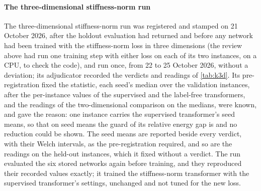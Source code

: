 \paragraph{The three-dimensional stiffness-norm run}
The three-dimensional stiffness-norm run was registered and stamped on 21 October 2026,
after the holdout evaluation had returned and before any network had been trained with the
stiffness-norm loss in three dimensions (the review above had run one training step with
either loss on each of its two instances, on a CPU, to check the code), and run once, from
22 to 25 October 2026, without a deviation; its adjudicator recorded the verdicts and
readings of \cref{tab:k3d}. Its pre-registration fixed the statistic, each seed's median
over the validation instances, after the per-instance values of the supervised and the
label-free transformers, and the readings of the two-dimensional comparison on the medians,
were known, and gave the reason: one instance carries the supervised transformer's seed
means, so that on seed means the guard of its relative energy gap is \numKdMeansGapTau{} and
no reduction could be shown. The seed means are reported beside every verdict, with their
Welch intervals, as the pre-registration required, and so are the readings on the held-out
instances, which it fixed without a verdict. The run evaluated the six stored networks again
before training, and they reproduced their recorded values exactly; it trained the
stiffness-norm transformer with the supervised transformer's settings, unchanged and not
tuned for the new loss.

